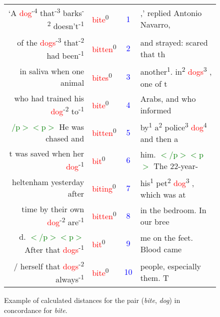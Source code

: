 \documentclass[output=paper]{langsci/langscibook}
\begin{document}
\begin{figure}[h]
\begin{tabular}{rlcl}
`A \textcolor{red}{dog}\textsuperscript{-4} that\textsuperscript{-3} barks\textsuperscript{-2} doesn't\textsuperscript{-1} & \textcolor{red}{bite}\textsuperscript{0} & \textcolor{blue}{1} & ,' replied Antonio Navarro, \\
of the \textcolor{red}{dogs}\textsuperscript{-3} that\textsuperscript{-2} had been\textsuperscript{-1} & \textcolor{red}{bitten}\textsuperscript{0} & \textcolor{blue}{2} & and strayed: scared that th \\
in saliva when one animal & \textcolor{red}{bites}\textsuperscript{0} & \textcolor{blue}{3} & another\textsuperscript{1}. in\textsuperscript{2} \textcolor{red}{dogs}\textsuperscript{3} , one of t \\
who had trained his \textcolor{red}{dog}\textsuperscript{-2} to\textsuperscript{-1} & \textcolor{red}{bite}\textsuperscript{0} & \textcolor{blue}{4} & Arabs, and who informed \\
\textcolor{green}{/p$>$$<$p$>$} He was chased and & \textcolor{red}{bitten}\textsuperscript{0} & \textcolor{blue}{5} & by\textsuperscript{1} a\textsuperscript{2} police\textsuperscript{3} \textcolor{red}{dog}\textsuperscript{4} and then a \\
t was saved when her \textcolor{red}{dog}\textsuperscript{-1} & \textcolor{red}{bit}\textsuperscript{0} & \textcolor{blue}{6} & him. \textcolor{green}{$<$/p$><$p$>$} The 22-year- \\
heltenham yesterday after & \textcolor{red}{biting}\textsuperscript{0} & \textcolor{blue}{7} & his\textsuperscript{1} pet\textsuperscript{2} \textcolor{red}{dog}\textsuperscript{3} , which was at \\
time by their own \textcolor{red}{dog}\textsuperscript{-2} are\textsuperscript{-1} & \textcolor{red}{bitten}\textsuperscript{0} & \textcolor{blue}{8} & in the bedroom. In our bree \\
d. \textcolor{green}{$<$/p$><$p$>$} After that \textcolor{red}{dogs}\textsuperscript{-1} & \textcolor{red}{bit}\textsuperscript{0} & \textcolor{blue}{9} & me on the feet. Blood came \\
/ herself that \textcolor{red}{dogs}\textsuperscript{-2} always\textsuperscript{-1} & \textcolor{red}{bite}\textsuperscript{0} & \textcolor{blue}{10} & people, especially them. T
\end{tabular}
\caption{ Example of calculated distances for the pair (\textit{bite}, \textit{dog}) in
concordance for \textit{bite}.}
\label{fig:04:02}
\end{figure}
\end{document}
